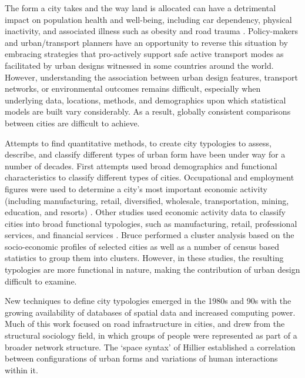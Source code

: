 \documentclass[10pt,letterpaper,hidelinks]{article}
\begin{document}
The form a city takes and the way land is allocated can have a detrimental impact on population health and well-being, including car dependency, physical inactivity, and associated illness such as obesity and road trauma \cite{Giles-corti2016,Kleinert2016,Goenka2016,Zapata-Diomedi2017,Heesch2014,Daley2011, Cepeda2016,MingWen2008,Norman2006,Thompson2018}. Policy-makers and urban/transport planners have an opportunity to reverse this situation by embracing strategies that pro-actively support safe active transport modes as facilitated by urban designs witnessed in some countries around the world. However, understanding the association between urban design features, transport networks, or environmental outcomes remains difficult, especially when underlying data, locations, methods, and demographics upon which statistical models are built vary considerably. As a result, globally consistent comparisons between cities are difficult to achieve. 

Attempts to find quantitative methods, to create city typologies to assess, describe, and classify different types of urban form have been under way for a number of decades. First attempts used broad demographics and functional characteristics to classify different types of cities. Occupational and employment figures were used to determine a city's most important economic activity (including manufacturing, retail, diversified, wholesale, transportation, mining, education, and resorts) \cite{Harris1943}. Other studies used economic activity data to classify cities into broad functional typologies, such as manufacturing, retail, professional services, and financial services \cite{Nelson1955}. Bruce \cite{Bruce1971} performed a cluster analysis based on the socio-economic profiles of selected cities as well as a number of census based statistics to group them into clusters. However, in these studies, the resulting typologies are more functional in nature, making the contribution of urban design difficult to examine.

New techniques to define city typologies emerged in the 1980s and 90s with the growing availability of databases of spatial data and increased computing power. Much of this work focused on road infrastructure in cities, and drew from the structural sociology field, in which groups of people were represented as part of a broader network structure. The `space syntax' of Hillier \cite{Hillier1996} established a correlation between configurations of urban forms and variations of human interactions within it. 
\end{document}
